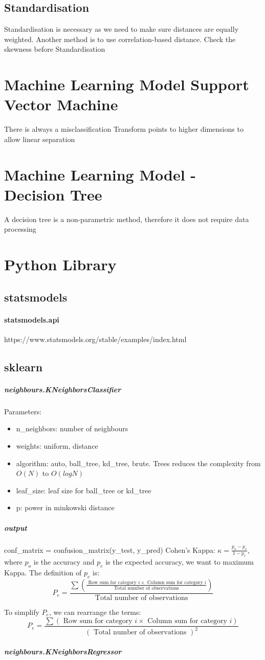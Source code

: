 \documentclass[12pt,a4paper]{article}
\begin{document}
\subsection{Standardisation}
    Standardisation is necessary as we need to make sure distances are equally weighted. Another method is to use correlation-based distance.
    Check the skewness before Standardisation

\section{Machine Learning Model Support Vector Machine}
    There is always a misclassification
    Transform points to higher dimensions to allow linear separation

\section{Machine Learning Model - Decision Tree}
    A decision tree is a non-parametric method, therefore it does not require data processing

\section{Python Library}
\subsection{statsmodels}
    \paragraph{statsmodels.api}
    https://www.statsmodels.org/stable/examples/index.html
\subsection{sklearn}
    \subparagraph{neighbours.KNeighborsClassifier}
        Parameters:
        \begin{itemize}
            \item n\_neighbors: number of neighbours
            \item weights: uniform, distance
            \item algorithm: auto, ball\_tree, kd\_tree, brute. Trees reduces the complexity from $O(N)$ to $O(logN)$
            \item leaf\_size: leaf size for ball\_tree or kd\_tree
            \item p: power in minkowski distance
        \end{itemize}
    \subparagraph{output}
        conf\_matrix = confusion\_matrix(y\_test, y\_pred)
        Cohen's Kappa: $\kappa=\frac{p_o-p_e}{1-p_e}$, where $p_o$ is the accuracy and $p_e$ is the expected accuracy, we want to maximum Kappa.
        The definition of $p_e$ is:
        $$
        P_e=\frac{\sum\left(\frac{\text { Row sum for category } i \times \text { Column sum for category } i}{\text { Total number of observations }}\right)}{\text { Total number of observations }}
        $$
        
        To simplify $P_e$, we can rearrange the terms:
        $$
        P_e=\frac{\sum(\text { Row sum for category } i \times \text { Column sum for category } i)}{(\text { Total number of observations })^2}
        $$
    \subparagraph{neighbours.KNeighborsRegressor}
    
\end{document}
